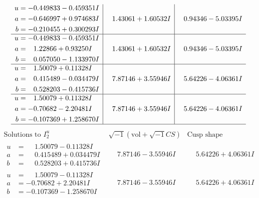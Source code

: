 \documentclass[1p]{elsarticle_modified}
\theoremstyle{definition}
\newcommand{\I}{\sqrt{-1}}
\begin{document}
$$\begin{array}{c|c|c}
\begin{aligned}
u &= -0.449833 - 0.459351 I \\
a &= -0.646997 + 0.974683 I \\
b &= -0.210455 + 0.300293 I\end{aligned}
 & \phantom{-}1.43061 + 1.60532 I & \phantom{-}0.94346 - 5.03395 I \\ \hline\begin{aligned}
u &= -0.449833 - 0.459351 I \\
a &= \phantom{-}1.22866 + 0.93250 I \\
b &= \phantom{-}0.057050 - 1.133970 I\end{aligned}
 & \phantom{-}1.43061 + 1.60532 I & \phantom{-}0.94346 - 5.03395 I \\ \hline\begin{aligned}
u &= \phantom{-}1.50079 + 0.11328 I \\
a &= \phantom{-}0.415489 - 0.034479 I \\
b &= \phantom{-}0.528203 - 0.415736 I\end{aligned}
 & \phantom{-}7.87146 + 3.55946 I & \phantom{-}5.64226 - 4.06361 I \\ \hline\begin{aligned}
u &= \phantom{-}1.50079 + 0.11328 I \\
a &= -0.70682 - 2.20481 I \\
b &= -0.107369 + 1.258670 I\end{aligned}
 & \phantom{-}7.87146 + 3.55946 I & \phantom{-}5.64226 - 4.06361 I\\
 \hline 
 \end{array}$$\newpage$$\begin{array}{c|c|c}  
\text{Solutions to }I^u_{2}& \I (\text{vol} + \sqrt{-1}CS) & \text{Cusp shape}\\
 \hline 
\begin{aligned}
u &= \phantom{-}1.50079 - 0.11328 I \\
a &= \phantom{-}0.415489 + 0.034479 I \\
b &= \phantom{-}0.528203 + 0.415736 I\end{aligned}
 & \phantom{-}7.87146 - 3.55946 I & \phantom{-}5.64226 + 4.06361 I \\ \hline\begin{aligned}
u &= \phantom{-}1.50079 - 0.11328 I \\
a &= -0.70682 + 2.20481 I \\
b &= -0.107369 - 1.258670 I\end{aligned}
 & \phantom{-}7.87146 - 3.55946 I & \phantom{-}5.64226 + 4.06361 I \\ \hline\begin{aligned}

\end{aligned}
\end{array}$$
\end{document}
